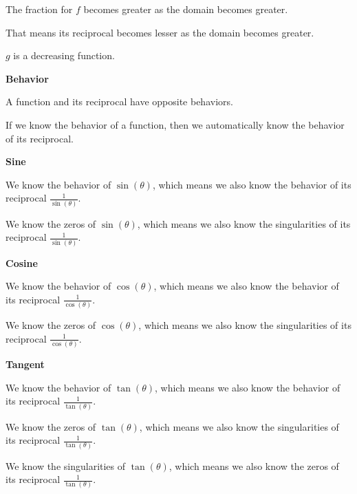 \documentclass{ximera}
\begin{document}
\begin{exmaple}
The fraction for $f$ becomes greater as the domain becomes greater. 

That means its reciprocal becomes lesser as the domain becomes greater. 

$g$ is a decreasing function.




\begin{fact} \textbf{\textcolor{red!75!green}{Behavior}} 

A function and its reciprocal have opposite behaviors.


\end{fact}

If we know the behavior of a function, then we automatically know the behavior of its reciprocal. 





\textbf{\textcolor{purple!80!black}{Sine}} 

We know the behavior of $\sin(\theta)$, which means we also know the behavior of its reciprocal $\frac{1}{\sin(\theta)}$. 


We know the zeros of $\sin(\theta)$, which means we also know the singularities of its reciprocal $\frac{1}{\sin(\theta)}$. 







\textbf{\textcolor{purple!80!black}{Cosine}} 

We know the behavior of $\cos(\theta)$, which means we also know the behavior of its reciprocal $\frac{1}{\cos(\theta)}$. 


We know the zeros of $\cos(\theta)$, which means we also know the singularities of its reciprocal $\frac{1}{\cos(\theta)}$. 










\textbf{\textcolor{purple!80!black}{Tangent}} 

We know the behavior of $\tan(\theta)$, which means we also know the behavior of its reciprocal $\frac{1}{\tan(\theta)}$. 


We know the zeros of $\tan(\theta)$, which means we also know the singularities of its reciprocal $\frac{1}{\tan(\theta)}$. 





We know the singularities of $\tan(\theta)$, which means we also know the zeros of its reciprocal $\frac{1}{\tan(\theta)}$. 











\end{exmaple}
\end{document}
